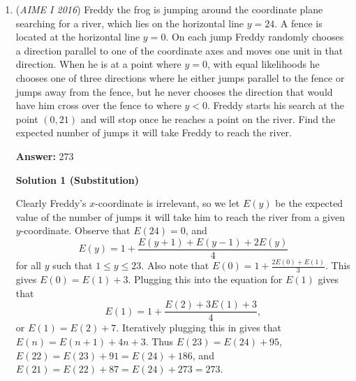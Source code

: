 \begin{enumerate}
 



\textbf{Solution 2}

First, we can show that $2,3,5,7$ $\not |$ $m^2 - m + 11$. This can be done by just testing all residue classes. 

 For example, we can test $m \equiv 0 \mod 2$  or  $m \equiv 1 \mod 2$  to show that $m^2 - m + 11$ is not divisible by 2.

 Case 1: m = 2k  

 \begin{verbatim}
	$m^2 - m + 11  \equiv 2(2 \cdot k^2 - k + 5) +1 \equiv 1 \mod 2$
\end{verbatim}

Case 2: m = 2k+1  

 \begin{verbatim}
	$m^2 - m + 11  \equiv 2(2 \cdot k^2 + k + 5) +1 \equiv 1 \mod 2$
\end{verbatim}

Now, we can test $m^2 - m + 11 = 11^4$, which fails, so we test $m^2 - m + 11 = 11^3 \cdot 13$, and we get m = $132$.

 -AlexLikeMath

 


 


	\item (\textit{AIME I 2016}) Freddy the frog is jumping around the coordinate plane searching for a river, which lies on the horizontal line $y = 24$. A fence is located at the horizontal line $y = 0$. On each jump Freddy randomly chooses a direction parallel to one of the coordinate axes and moves one unit in that direction. When he is at a point where $y=0$, with equal likelihoods he chooses one of three directions where he either jumps parallel to the fence or jumps away from the fence, but he never chooses the direction that would have him cross over the fence to where $y < 0$. Freddy starts his search at the point $(0, 21)$ and will stop once he reaches a point on the river. Find the expected number of jumps it will take Freddy to reach the river.


 
 \textbf{Answer: }273



\textbf{Solution 1 (Substitution)}

Clearly Freddy's $x$-coordinate is irrelevant, so we let $E(y)$ be the expected value of the number of jumps it will take him to reach the river from a given $y$-coordinate. Observe that $E(24)=0$, and 
 \[E(y)=1+\frac{E(y+1)+E(y-1)+2E(y)}{4}\] for all $y$ such that $1\le y\le 23$. Also note that $E(0)=1+\frac{2E(0)+E(1)}{3}$. This gives $E(0)=E(1)+3$. Plugging this into the equation for $E(1)$ gives that 
 \[E(1)=1+\frac{E(2)+3E(1)+3}{4},\] or $E(1)=E(2)+7$. Iteratively plugging this in gives that $E(n)=E(n+1)+4n+3$. Thus $E(23)=E(24)+95$, $E(22)=E(23)+91=E(24)+186$, and $E(21)=E(22)+87=E(24)+273=\boxed{273}$.


\end{enumerate}
